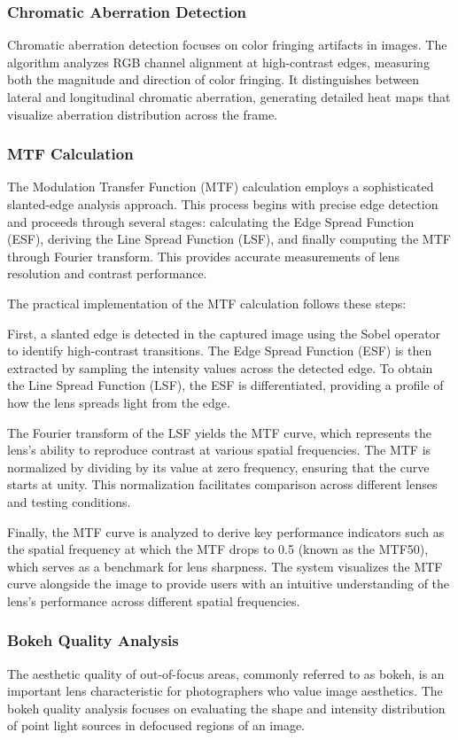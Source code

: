 \subsubsection{Chromatic Aberration Detection}
Chromatic aberration detection focuses on color fringing artifacts in images. The algorithm analyzes RGB channel alignment at high-contrast edges, measuring both the magnitude and direction of color fringing. It distinguishes between lateral and longitudinal chromatic aberration, generating detailed heat maps that visualize aberration distribution across the frame.

\subsubsection{MTF Calculation}
The Modulation Transfer Function (MTF) calculation employs a sophisticated slanted-edge analysis approach. This process begins with precise edge detection and proceeds through several stages: calculating the Edge Spread Function (ESF), deriving the Line Spread Function (LSF), and finally computing the MTF through Fourier transform. This provides accurate measurements of lens resolution and contrast performance.

The practical implementation of the MTF calculation follows these steps:

First, a slanted edge is detected in the captured image using the Sobel operator to identify high-contrast transitions. The Edge Spread Function (ESF) is then extracted by sampling the intensity values across the detected edge. To obtain the Line Spread Function (LSF), the ESF is differentiated, providing a profile of how the lens spreads light from the edge.

The Fourier transform of the LSF yields the MTF curve, which represents the lens's ability to reproduce contrast at various spatial frequencies. The MTF is normalized by dividing by its value at zero frequency, ensuring that the curve starts at unity. This normalization facilitates comparison across different lenses and testing conditions.

Finally, the MTF curve is analyzed to derive key performance indicators such as the spatial frequency at which the MTF drops to 0.5 (known as the MTF50), which serves as a benchmark for lens sharpness. The system visualizes the MTF curve alongside the image to provide users with an intuitive understanding of the lens's performance across different spatial frequencies.

\subsubsection{Bokeh Quality Analysis}
The aesthetic quality of out-of-focus areas, commonly referred to as bokeh, is an important lens characteristic for photographers who value image aesthetics. The bokeh quality analysis focuses on evaluating the shape and intensity distribution of point light sources in defocused regions of an image.

